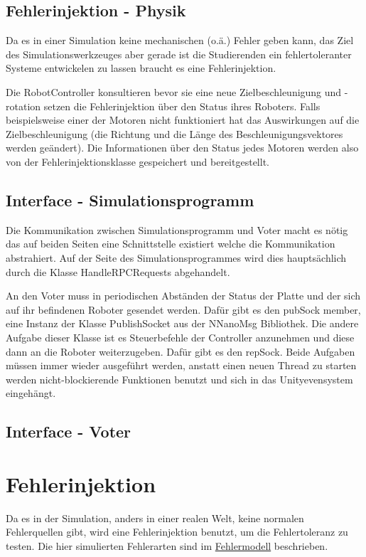 \subsection{Fehlerinjektion - Physik}
Da es in einer Simulation keine mechanischen (o.{\"{a}}.) Fehler geben kann, das Ziel des Simulationswerkzeuges aber gerade ist
die Studierenden ein fehlertoleranter Systeme entwickelen zu lassen braucht es eine Fehlerinjektion.

Die RobotController konsultieren bevor sie eine neue Zielbeschleunigung und -rotation setzen die Fehlerinjektion {\"{u}}ber den
Status ihres Roboters. Falls beispielsweise einer der Motoren nicht funktioniert hat das Auswirkungen auf die Zielbeschleunigung
(die Richtung und die L{\"{a}}nge des Beschleunigungsvektores werden ge{\"{a}}ndert). Die Informationen {\"{u}}ber den Status
jedes Motoren werden also von der Fehlerinjektionsklasse gespeichert und bereitgestellt.

\subsection{Interface - Simulationsprogramm}
Die Kommunikation zwischen Simulationsprogramm und Voter macht es n{\"{o}}tig das auf beiden Seiten eine Schnittstelle existiert
welche die Kommunikation abstrahiert. Auf der Seite des Simulationsprogrammes wird dies haupts{\"{a}}chlich durch die Klasse
HandleRPCRequests abgehandelt.

An den Voter muss in periodischen Abst{\"{a}}nden der Status der Platte und der sich auf ihr befindenen Roboter gesendet werden.
Daf{\"{u}}r gibt es den pubSock member, eine Instanz der Klasse PublishSocket aus der NNanoMsg Bibliothek. Die andere Aufgabe
dieser Klasse ist es Steuerbefehle der Controller anzunehmen und diese dann an die Roboter weiterzugeben. Daf{\"{u}}r gibt es
den repSock. Beide Aufgaben m{\"{u}}ssen immer wieder ausgef{\"{u}}hrt werden, anstatt einen neuen Thread zu starten werden
nicht-blockierende Funktionen benutzt und sich in das Unityevensystem eingeh{\"{a}}ngt.

\subsection{Interface - Voter}


\clearpage
\section{Fehlerinjektion}
Da es in der Simulation, anders in einer realen Welt, keine normalen Fehlerquellen gibt, wird eine
Fehlerinjektion benutzt, um die Fehlertoleranz zu testen. Die hier simulierten Fehlerarten 
sind im \hyperref[fm]{Fehlermodell} beschrieben.

